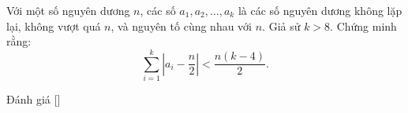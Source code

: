 \ifshowproblem
\begin{problem}\label{problem:KOR-2015-MO-P8}
    Với một số nguyên dương \( n \), các số \( a_1, a_2, \ldots, a_k \) là các số nguyên dương không lặp lại, không vượt quá \( n \), 
    và nguyên tố cùng nhau với \( n \). Giả sử \( k > 8 \).  
    Chứng minh rằng:
    \[
        \sum_{i=1}^k \left| a_i - \frac{n}{2} \right| < \frac{n(k - 4)}{2}.
    \]
\end{problem}
\fi

\ifshowinfo
Đánh giá [\textbf{}]\footnotemark
{}
\fi